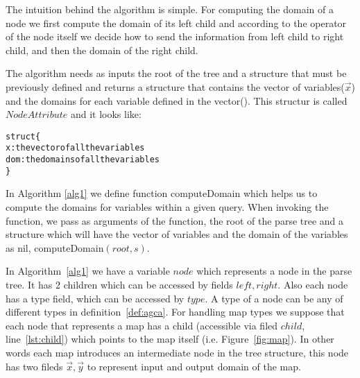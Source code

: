 \documentclass[12pt]{article}
\begin{document}
The intuition behind the algorithm is simple. For computing the domain of a node we first compute the domain of its left child and according to the operator of the node itself we decide how to send the information from left child to right child, and then the domain of the right child.

The algorithm needs as inputs the root of the tree and a structure that must be previously defined and returns a structure that contains the vector of variables($\vec{x}$) and the domains for each variable defined in the vector(\dom). This structur is called $NodeAttribute$ and it looks like:

\begin{program}
\begin{alltt}
struct \{
x: the vector of all the variables 
dom: the domains of all the variables
\}
\end{alltt}
\caption{$NodeAttribute$}
\label{struct}
\end{program}
In Algorithm \ref{alg1} we define function \textsf{computeDomain} which helps us to compute the domains for variables within a given query. When invoking the function, we pass as arguments of the function, the root of the parse tree and a structure which will have the vector of variables and the domain of the variables as nil, \textsf{computeDomain}$(root,s)$.
\par
In Algorithm~\ref{alg1} we have a variable $node$ which represents a node in the parse tree. It has 2 children which can be accessed by fields $left, right$. Also each node has a type field, which can be accessed by $type$. A type of a node can be any of different types in definition~\eqref{def:agca}. For handling map types we suppose that each node that represents a map has a child (accessible via filed $child$, line~\ref{lst:child}) which points to the map itself (i.e. Figure~\ref{fig:map}). In other words each map introduces an intermediate node in the tree structure, this node has two fileds $\vec{x},\vec{y}$ to represent input and output domain of the map. 
\end{document}
